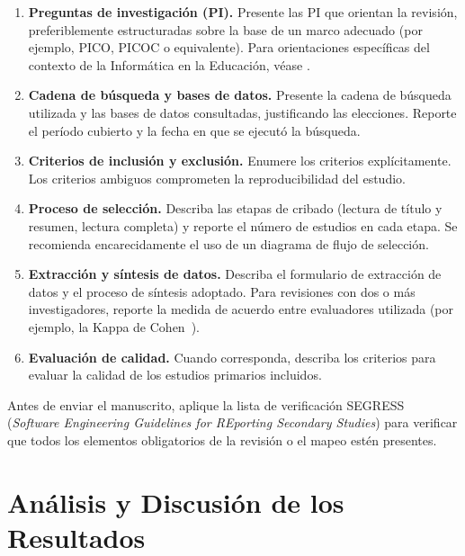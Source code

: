 \documentclass[spanish]{rbie2026}%
\begin{document}
\begin{enumerate}
  \item \textbf{Preguntas de investigación (PI).} Presente las PI que orientan la revisión, preferiblemente estructuradas sobre la base de un marco adecuado (por ejemplo, PICO, PICOC o equivalente). Para orientaciones específicas del contexto de la Informática en la Educación, véase \citep{mpcie_vol2_cap3_rsl}.

  \item \textbf{Cadena de búsqueda y bases de datos.} Presente la cadena de búsqueda utilizada y las bases de datos consultadas, justificando las elecciones. Reporte el período cubierto y la fecha en que se ejecutó la búsqueda.

  \item \textbf{Criterios de inclusión y exclusión.} Enumere los criterios explícitamente. Los criterios ambiguos comprometen la reproducibilidad del estudio.

  \item \textbf{Proceso de selección.} Describa las etapas de cribado (lectura de título y resumen, lectura completa) y reporte el número de estudios en cada etapa. Se recomienda encarecidamente el uso de un diagrama de flujo de selección.

  \item \textbf{Extracción y síntesis de datos.} Describa el formulario de extracción de datos y el proceso de síntesis adoptado. Para revisiones con dos o más investigadores, reporte la medida de acuerdo entre evaluadores utilizada (por ejemplo, la Kappa de Cohen~\citep{Cohen1960}).

  \item \textbf{Evaluación de calidad.} Cuando corresponda, describa los criterios para evaluar la calidad de los estudios primarios incluidos.
\end{enumerate}

Antes de enviar el manuscrito, aplique la lista de verificación SEGRESS~\citep{Kitchenham2023_SEGRESS_supp} (\textit{Software Engineering Guidelines for REporting Secondary Studies}) para verificar que todos los elementos obligatorios de la revisión o el mapeo estén presentes.

\section{Análisis y Discusión de los Resultados}
\label{sec:analysis}
\end{document}
